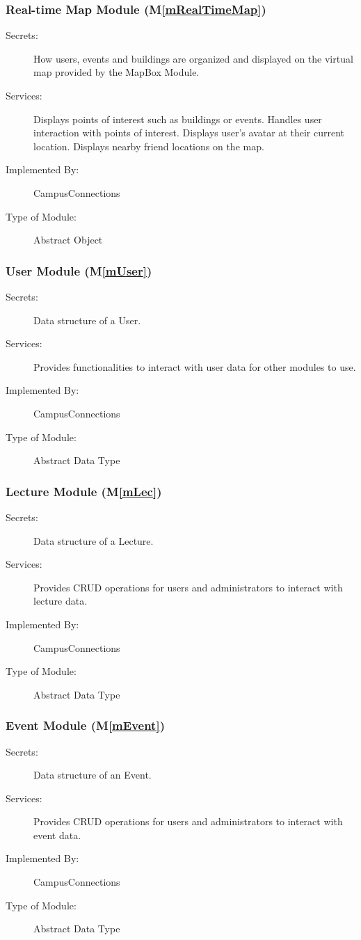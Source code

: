 \documentclass[12pt, titlepage]{article}
\newcommand{\mref}[1]{M\ref{#1}}
\begin{document}
\subsubsection{Real-time Map Module (\mref{mRealTimeMap})}
\begin{description}
\item[Secrets:]How users, events and buildings are organized and displayed on the virtual map provided by the MapBox Module.
\item[Services:]Displays points of interest such as buildings or events. Handles user interaction with points of interest. Displays user's avatar at their current location. Displays nearby friend locations on the map.
\item[Implemented By:] CampusConnections
\item[Type of Module:] Abstract Object
\end{description}

\subsubsection{User Module (\mref{mUser})}
\begin{description}
  \item[Secrets:]Data structure of a User.
  \item[Services:]Provides functionalities to interact with user data for other modules to use.
  \item[Implemented By:] CampusConnections
  \item[Type of Module:] Abstract Data Type
\end{description}

\subsubsection{Lecture Module (\mref{mLec})}
\begin{description}
  \item[Secrets:]Data structure of a Lecture.
  \item[Services:]Provides CRUD operations for users and administrators to interact with lecture data.
  \item[Implemented By:] CampusConnections
  \item[Type of Module:] Abstract Data Type
\end{description}

\subsubsection{Event Module (\mref{mEvent})}
\begin{description}
  \item[Secrets:]Data structure of an Event.
  \item[Services:]Provides CRUD operations for users and administrators to interact with event data.
  \item[Implemented By:] CampusConnections
  \item[Type of Module:] Abstract Data Type
\end{description}
\end{document}
